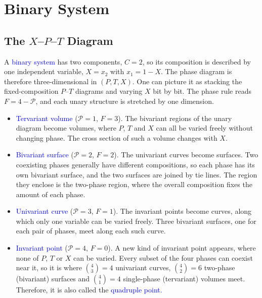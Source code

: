\section{Binary System}

\subsection{The $X$--$P$--$T$ Diagram}
A \textcolor{blue}{binary system} has two components, $C=2$, so its composition is described by one
independent variable, $X=x_2$ with $x_1=1-X$. The phase diagram is therefore
three-dimensional in $(P,T,X)$. One can picture it as stacking the fixed-composition
$P$--$T$ diagrams and varying $X$ bit by bit. The phase rule reads
$F=4-\mathcal{P}$, and each unary structure is stretched by one dimension.

\begin{itemize}
    \item \textcolor{blue}{Tervariant volume} ($\mathcal{P}=1$, $F=3$). The bivariant regions of the
    unary diagram become volumes, where $P$, $T$ and $X$ can all be varied freely
    without changing phase. The cross section of such a volume changes with $X$.
    \item \textcolor{blue}{Bivariant surface} ($\mathcal{P}=2$, $F=2$). The univariant curves become
    surfaces. Two coexisting phases generally have different compositions, so each
    phase has its own bivariant surface, and the two surfaces are joined by tie
    lines. The region they enclose is the two-phase region, where the overall
    composition fixes the amount of each phase.
    \item \textcolor{blue}{Univariant curve} ($\mathcal{P}=3$, $F=1$). The invariant points become
    curves, along which only one variable can be varied freely. Three bivariant
    surfaces, one for each pair of phases, meet along each such curve.
    \item \textcolor{blue}{Invariant point} ($\mathcal{P}=4$, $F=0$). A new kind of invariant point
    appears, where none of $P$, $T$ or $X$ can be varied. Every subset of the four
    phases can coexist near it, so it is where $\binom{4}{3}=4$ univariant curves,
    $\binom{4}{2}=6$ two-phase (bivariant) surfaces and $\binom{4}{1}=4$
    single-phase (tervariant) volumes meet. Therefore, it is also called the \textcolor{blue}{quadruple point.}
\end{itemize}
